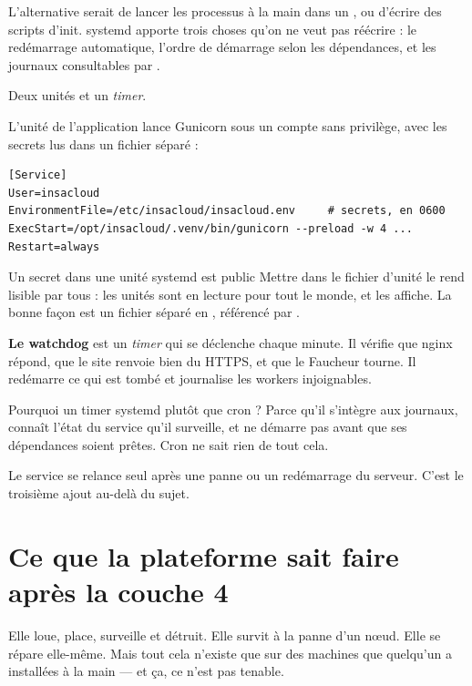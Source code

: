 \pourquoi
L'alternative serait de lancer les processus à la main dans un , ou
d'écrire des scripts d'init. systemd apporte trois choses qu'on ne veut pas
réécrire : le redémarrage automatique, l'ordre de démarrage selon les
dépendances, et les journaux consultables par .

\role
Deux unités et un \emph{timer}.

L'unité de l'application lance Gunicorn sous un compte sans privilège, avec les
secrets lus dans un fichier séparé :

\begin{lstlisting}
[Service]
User=insacloud
EnvironmentFile=/etc/insacloud/insacloud.env     # secrets, en 0600
ExecStart=/opt/insacloud/.venv/bin/gunicorn --preload -w 4 ...
Restart=always
\end{lstlisting}

\begin{piege}{Un secret dans une unité systemd est public}
Mettre  dans le fichier d'unité le
rend lisible par tous : les unités sont en lecture pour tout le monde, et
 les affiche. La bonne façon est un fichier séparé en
, référencé par .
\end{piege}

\textbf{Le watchdog} est un \emph{timer} qui se déclenche chaque minute. Il
vérifie que nginx répond, que le site renvoie bien du HTTPS, et que le Faucheur
tourne. Il redémarre ce qui est tombé et journalise les workers injoignables.

Pourquoi un timer systemd plutôt que cron ? Parce qu'il s'intègre aux journaux,
connaît l'état du service qu'il surveille, et ne démarre pas avant que ses
dépendances soient prêtes. Cron ne sait rien de tout cela.

\apport
Le service se relance seul après une panne ou un redémarrage du serveur. C'est
le troisième ajout au-delà du sujet.

\section*{Ce que la plateforme sait faire après la couche 4}

Elle loue, place, surveille et détruit. Elle survit à la panne d'un nœud. Elle
se répare elle-même. Mais tout cela n'existe que sur des machines que
quelqu'un a installées à la main --- et ça, ce n'est pas tenable.
